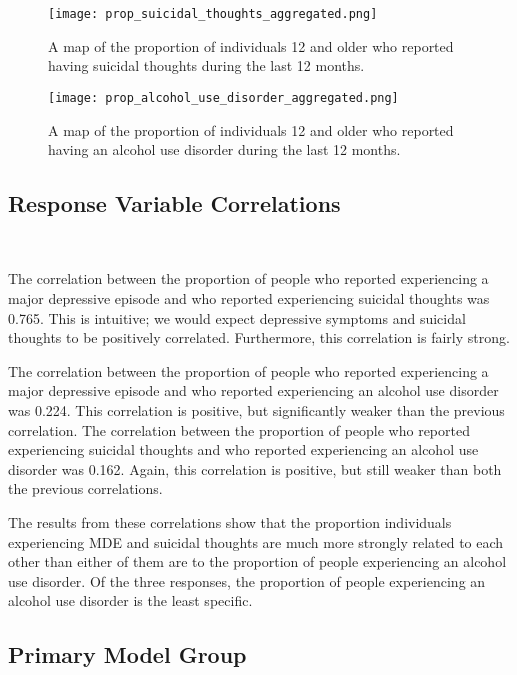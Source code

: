 \documentclass{article}
\begin{document}
\begin{figure}[!htb]
    \centering
    \texttt{[image: prop\_suicidal\_thoughts\_aggregated.png]}
    \caption{\label{fig:map-suicidal-thoughts}
    A map of the proportion of individuals 12 and older who
	reported having suicidal thoughts during the last 12 months.}
\end{figure}

\begin{figure}[!htb]
    \centering
    \texttt{[image: prop\_alcohol\_use\_disorder\_aggregated.png]}
    \caption{\label{fig:map-alcohol-use}
    A map of the proportion of individuals 12 and older who
	reported having an alcohol use disorder during the last 12 months.}
\end{figure}

\subsection{Response Variable Correlations}~\label{sec:results-corr}

The correlation between the proportion of people who reported experiencing
a major depressive episode and
who reported experiencing suicidal thoughts was
0.765.
This is intuitive; we would expect depressive symptoms and suicidal thoughts
to be positively correlated.
Furthermore, this correlation is fairly strong.

The correlation between the proportion of people who reported experiencing
a major depressive episode and
who reported experiencing an alcohol use disorder was
0.224.
This correlation is positive, but significantly weaker than
the previous correlation.
The correlation between the proportion of people who reported experiencing
suicidal thoughts and
who reported experiencing an alcohol use disorder was
0.162.
Again, this correlation is positive, but still weaker than
both the previous correlations.

The results from these correlations show that the proportion individuals
experiencing MDE and suicidal thoughts are much more strongly related to each
other than either of them are to the proportion of people experiencing
an alcohol use disorder.
Of the three responses, the proportion of people experiencing an
alcohol use disorder is the least specific.


\subsection{Primary Model Group}
\end{document}
